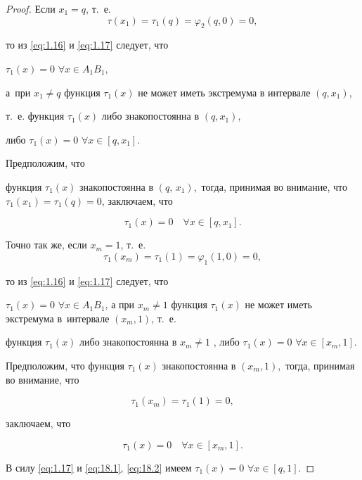 \begin{proof}
Если ${x_1} = q$, т.~е. $$\tau ({x_1}) = {\tau _1}(q) = {\varphi _2}(q, 0) = 0,$$

то из \eqref{eq:1.16} и \eqref{eq:1.17} следует, что 

${\tau _1}(x) = 0$ $\forall x \in {A_1}{B_1},$ 

а~при ${x_1} \ne q$ функция ${\tau _1}(x)$ не может иметь экстремума в интервале $( q, {x_1})$, 

т.~е. функция ${\tau _1}(x)$ либо знакопостоянна в $(q, x_{1})$, 

либо  ${\tau _1}(x) = 0$ $\forall x \in [ q, x_{1} ]$.  



Предположим, что

функция ${\tau _1}(x)$ знакопостоянна в $(q,\,x_{1}),$ тогда, принимая во внимание, что ${\tau _1}({x_1}) = {\tau _1}(q) = 0$, заключаем, что

\begin{equation}

{\tau _1}(x) = 0\quad \forall x \in [ q, x_1]. \label{eq:18.1}

\end{equation}



Точно так же, если ${x_m} = 1$, т.~е. $${\tau _1}({x_m}) = {\tau _1}(1) = {\varphi _1}(1, 0) = 0,$$ 

то из \eqref{eq:1.16} и \eqref{eq:1.17} следует, что 

${\tau _1}(x) = 0$ $\forall x \in {A_1}{B_1}$, а при ${x_m} \ne 1$ функция ${\tau _1}(x)$ не может иметь экстремума в~интервале $({x_m}, 1)$, т.~е.

функция ${\tau _1}(x)$ либо знакопостоянна в ${x_m} \ne 1$ , либо ${\tau _1}(x) = 0$ $\forall x \in [ {x_m}, 1]$. 



Предположим, что функция ${\tau_1}(x)$ знакопостоянна в $({x_m}, 1),$ тогда, принимая во внимание, что 

$${\tau _1}({x_m}) = {\tau _1}(1) = 0,$$ 

заключаем, что 

\begin{equation}

{\tau _1}(x) = 0\quad \forall x \in [ x_m, 1].

\label{eq:18.2}

\end{equation}

В силу \eqref{eq:1.17} и \eqref{eq:18.1}, \eqref{eq:18.2} имеем ${\tau _1}(x) = 0$ $\forall x \in [q, 1]$.


\end{proof}
